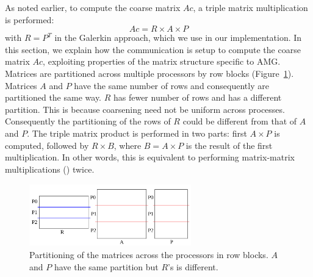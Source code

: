 
As noted earlier, to compute the coarse matrix $Ac$, a triple matrix multiplication is performed:
\begin{equation}
 Ac = R \times A \times P
\end{equation}
with $R = P^T$ in the Galerkin approach, which we use in our implementation.
%
In this section, we explain how the communication is setup to compute the coarse matrix $Ac$, exploiting properties of the matrix structure specific to AMG. 
%
Matrices are partitioned across multiple processors by row blocks (Figure~\ref{fig:partition}). Matrices $A$ and $P$ have the same number of rows and consequently are partitioned the same way. $R$ has fewer number of rows and has a different partition. This is because coarsening need not be uniform across processes. Consequently the partitioning of the rows of $R$ could be different from that of $A$ and $P$. The triple matrix product is performed in two parts: first $A \times P$ is computed, followed by $R \times B$, where $B = A \times P$ is the result of the first multiplication. In other words, this is equivalent to performing matrix-matrix multiplications (\mm) twice.

\begin{figure}[tbh]
 \centering
 \includegraphics[width=7cm,height=2.7cm]{./figures/partition.pdf}
 \caption{Partitioning of the matrices across the processors in row blocks. $A$ and $P$ have the same partition but $R$'s is different.}
 \label{fig:partition}
\end{figure}

